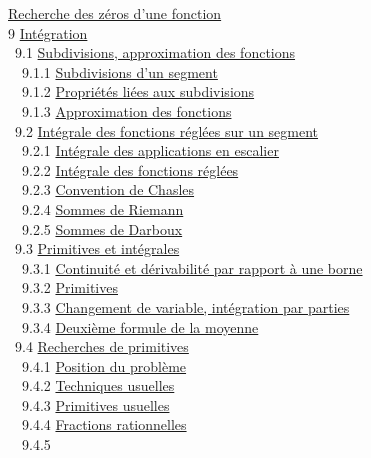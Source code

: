 \documentclass[]{article}
\begin{document}
\href{coursse49.html\#x60-2620008.6.3}{Recherche des zéros d'une
fonction} \\ 9 \href{coursch10.html\#x61-2630009}{Intégration} \\ ~9.1
\href{coursse50.html\#x62-2640009.1}{Subdivisions, approximation des
fonctions} \\ ~~9.1.1
\href{coursse50.html\#x62-2650009.1.1}{Subdivisions d'un segment} \\
~~9.1.2 \href{coursse50.html\#x62-2660009.1.2}{Propriétés liées aux
subdivisions} \\ ~~9.1.3
\href{coursse50.html\#x62-2670009.1.3}{Approximation des fonctions} \\
~9.2 \href{coursse51.html\#x63-2680009.2}{Intégrale des fonctions
réglées sur un segment} \\ ~~9.2.1
\href{coursse51.html\#x63-2690009.2.1}{Intégrale des applications en
escalier} \\ ~~9.2.2 \href{coursse51.html\#x63-2700009.2.2}{Intégrale
des fonctions réglées} \\ ~~9.2.3
\href{coursse51.html\#x63-2710009.2.3}{Convention de Chasles} \\ ~~9.2.4
\href{coursse51.html\#x63-2720009.2.4}{Sommes de Riemann} \\ ~~9.2.5
\href{coursse51.html\#x63-2730009.2.5}{Sommes de Darboux} \\ ~9.3
\href{coursse52.html\#x64-2740009.3}{Primitives et intégrales} \\
~~9.3.1 \href{coursse52.html\#x64-2750009.3.1}{Continuité et
dérivabilité par rapport à une borne} \\ ~~9.3.2
\href{coursse52.html\#x64-2760009.3.2}{Primitives} \\ ~~9.3.3
\href{coursse52.html\#x64-2770009.3.3}{Changement de variable,
intégration par parties} \\ ~~9.3.4
\href{coursse52.html\#x64-2780009.3.4}{Deuxième formule de la moyenne}
\\ ~9.4 \href{coursse53.html\#x65-2790009.4}{Recherches de primitives}
\\ ~~9.4.1 \href{coursse53.html\#x65-2800009.4.1}{Position du problème}
\\ ~~9.4.2 \href{coursse53.html\#x65-2810009.4.2}{Techniques usuelles}
\\ ~~9.4.3 \href{coursse53.html\#x65-2820009.4.3}{Primitives usuelles}
\\ ~~9.4.4 \href{coursse53.html\#x65-2830009.4.4}{Fractions
rationnelles} \\ ~~9.4.5
\end{document}
